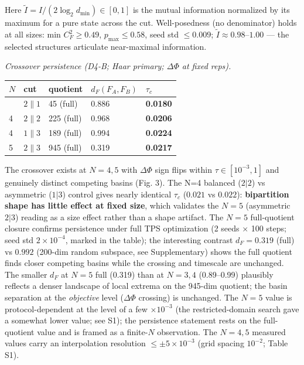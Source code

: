\documentclass[
]{article}
\begin{document}
Here \(\tilde I = I/(2\log_2 d_{\min}) \in [0,1]\) is the mutual
information normalized by its maximum for a pure state across the cut.
Well-posedness (no denominator) holds at all sizes: min
\(C_F^2 \ge 0.49\), \(p_{\max} \le 0.58\), seed std \(\le 0.009\);
\(\tilde I \approx 0.98\text{–}
1.00\) --- the selected structures articulate near-maximal information.

\emph{Crossover persistence (D4-B; Haar primary; \(\Delta\Phi\) at fixed
reps).}

{\def\LTcaptype{none} %
\begin{longtable}[]{@{}lllll@{}}
\toprule\noalign{}
\(N\) & cut & quotient & \(d_F(F_A,F_B)\) & \(\tau_c\) \\
\midrule\noalign{}
\endhead
\bottomrule\noalign{}
\endlastfoot
3 & \(2\|1\) & 45 (full) & 0.886 & \textbf{0.0180} \\
4 & \(2\|2\) & 225 (full) & 0.968 & \textbf{0.0206} \\
4 & \(1\|3\) & 189 (full) & 0.994 & \textbf{0.0224} \\
5 & \(2\|3\) & 945 (full) & 0.319 & \textbf{0.0217} \\
\end{longtable}
}

The crossover exists at \(N=4,5\) with \(\Delta\Phi\) sign flips within
\(\tau \in [10^{-3}, 1]\) and genuinely distinct competing basins (Fig.
3). The N=4 balanced (\(2|2\)) vs asymmetric (\(1|3\)) control gives
nearly identical \(\tau_c\) (\(0.021\) vs \(0.022\)):
\textbf{bipartition shape has little effect at fixed size}, which
validates the \(N=5\) (asymmetric \(2|3\)) reading as a size effect
rather than a shape artifact. The \(N=5\) full-quotient closure confirms
persistence under full TPS optimization (2 seeds × 100 steps; seed std
\(2\times10^{-4}\), marked in the table); the interesting contrast
\(d_F = 0.319\) (full) vs \(0.992\) (200-dim random subspace, see
Supplementary) shows the full quotient finds closer competing basins
while the crossing and timescale are unchanged. The smaller \(d_F\) at
\(N=5\) full (0.319) than at \(N=3,4\) (0.89--0.99) plausibly reflects a
denser landscape of local extrema on the 945-dim quotient; the basin
separation at the \emph{objective} level (\(\Delta\Phi\) crossing) is
unchanged. The \(N=5\) value is protocol-dependent at the level of a few
\(\times10^{-3}\) (the restricted-domain search gave a somewhat lower
value; see S1); the persistence statement rests on the full-quotient
value and is framed as a finite-\(N\) observation. The \(N=4,5\)
measured values carry an interpolation resolution
\(\le \pm 5\times10^{-3}\) (grid spacing \(10^{-2}\); Table S1).
\end{document}
